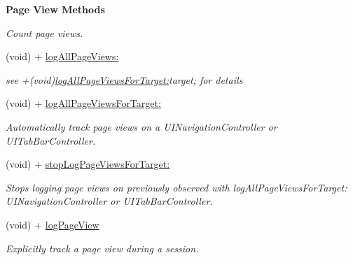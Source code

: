 \begin{Indent}\textbf{ Page View Methods}\par
{\em Count page views. }\begin{DoxyCompactItemize}
\item 
(void) + \hyperlink{interfaceFlurry_a6289ab504ab08ed9249fe5ef56eef646}{log\+All\+Page\+Views\+:}
\begin{DoxyCompactList}\small\item\em see +(void)\hyperlink{interfaceFlurry_ad8222c3e2257fb8aa22e9c93aa465ca6}{log\+All\+Page\+Views\+For\+Target\+:}target; for details \end{DoxyCompactList}\item 
(void) + \hyperlink{interfaceFlurry_ad8222c3e2257fb8aa22e9c93aa465ca6}{log\+All\+Page\+Views\+For\+Target\+:}
\begin{DoxyCompactList}\small\item\em Automatically track page views on a {\ttfamily U\+I\+Navigation\+Controller} or {\ttfamily U\+I\+Tab\+Bar\+Controller}. \end{DoxyCompactList}\item 
(void) + \hyperlink{interfaceFlurry_a732b380542c75c2f12d6ec90b9959aeb}{stop\+Log\+Page\+Views\+For\+Target\+:}
\begin{DoxyCompactList}\small\item\em Stops logging page views on previously observed with log\+All\+Page\+Views\+For\+Target\+: {\ttfamily U\+I\+Navigation\+Controller} or {\ttfamily U\+I\+Tab\+Bar\+Controller}. \end{DoxyCompactList}\item 
(void) + \hyperlink{interfaceFlurry_a612da8f1557fa0e29d50640400d896ec}{log\+Page\+View}
\begin{DoxyCompactList}\small\item\em Explicitly track a page view during a session. \end{DoxyCompactList}\end{DoxyCompactItemize}
\end{Indent}
